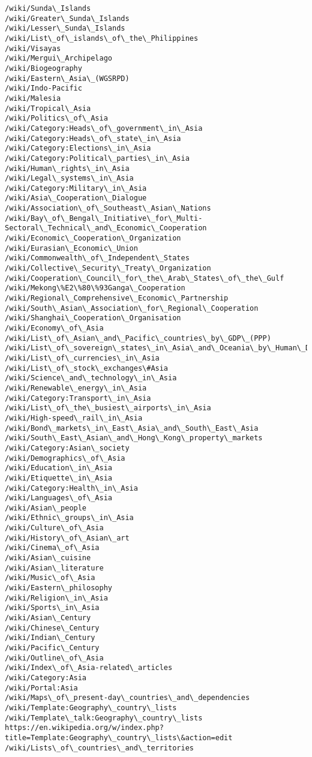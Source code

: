 \documentclass[11pt]{article}
\begin{document}
\begin{Verbatim}[commandchars=\\\{\}]
/wiki/Sunda\_Islands
/wiki/Greater\_Sunda\_Islands
/wiki/Lesser\_Sunda\_Islands
/wiki/List\_of\_islands\_of\_the\_Philippines
/wiki/Visayas
/wiki/Mergui\_Archipelago
/wiki/Biogeography
/wiki/Eastern\_Asia\_(WGSRPD)
/wiki/Indo-Pacific
/wiki/Malesia
/wiki/Tropical\_Asia
/wiki/Politics\_of\_Asia
/wiki/Category:Heads\_of\_government\_in\_Asia
/wiki/Category:Heads\_of\_state\_in\_Asia
/wiki/Category:Elections\_in\_Asia
/wiki/Category:Political\_parties\_in\_Asia
/wiki/Human\_rights\_in\_Asia
/wiki/Legal\_systems\_in\_Asia
/wiki/Category:Military\_in\_Asia
/wiki/Asia\_Cooperation\_Dialogue
/wiki/Association\_of\_Southeast\_Asian\_Nations
/wiki/Bay\_of\_Bengal\_Initiative\_for\_Multi-Sectoral\_Technical\_and\_Economic\_Cooperation
/wiki/Economic\_Cooperation\_Organization
/wiki/Eurasian\_Economic\_Union
/wiki/Commonwealth\_of\_Independent\_States
/wiki/Collective\_Security\_Treaty\_Organization
/wiki/Cooperation\_Council\_for\_the\_Arab\_States\_of\_the\_Gulf
/wiki/Mekong\%E2\%80\%93Ganga\_Cooperation
/wiki/Regional\_Comprehensive\_Economic\_Partnership
/wiki/South\_Asian\_Association\_for\_Regional\_Cooperation
/wiki/Shanghai\_Cooperation\_Organisation
/wiki/Economy\_of\_Asia
/wiki/List\_of\_Asian\_and\_Pacific\_countries\_by\_GDP\_(PPP)
/wiki/List\_of\_sovereign\_states\_in\_Asia\_and\_Oceania\_by\_Human\_Development\_Index
/wiki/List\_of\_currencies\_in\_Asia
/wiki/List\_of\_stock\_exchanges\#Asia
/wiki/Science\_and\_technology\_in\_Asia
/wiki/Renewable\_energy\_in\_Asia
/wiki/Category:Transport\_in\_Asia
/wiki/List\_of\_the\_busiest\_airports\_in\_Asia
/wiki/High-speed\_rail\_in\_Asia
/wiki/Bond\_markets\_in\_East\_Asia\_and\_South\_East\_Asia
/wiki/South\_East\_Asian\_and\_Hong\_Kong\_property\_markets
/wiki/Category:Asian\_society
/wiki/Demographics\_of\_Asia
/wiki/Education\_in\_Asia
/wiki/Etiquette\_in\_Asia
/wiki/Category:Health\_in\_Asia
/wiki/Languages\_of\_Asia
/wiki/Asian\_people
/wiki/Ethnic\_groups\_in\_Asia
/wiki/Culture\_of\_Asia
/wiki/History\_of\_Asian\_art
/wiki/Cinema\_of\_Asia
/wiki/Asian\_cuisine
/wiki/Asian\_literature
/wiki/Music\_of\_Asia
/wiki/Eastern\_philosophy
/wiki/Religion\_in\_Asia
/wiki/Sports\_in\_Asia
/wiki/Asian\_Century
/wiki/Chinese\_Century
/wiki/Indian\_Century
/wiki/Pacific\_Century
/wiki/Outline\_of\_Asia
/wiki/Index\_of\_Asia-related\_articles
/wiki/Category:Asia
/wiki/Portal:Asia
/wiki/Maps\_of\_present-day\_countries\_and\_dependencies
/wiki/Template:Geography\_country\_lists
/wiki/Template\_talk:Geography\_country\_lists
https://en.wikipedia.org/w/index.php?title=Template:Geography\_country\_lists\&action=edit
/wiki/Lists\_of\_countries\_and\_territories

\end{Verbatim}
\end{document}

